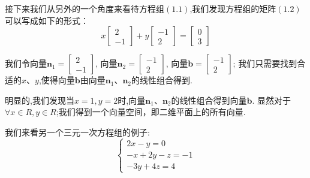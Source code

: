 \documentclass[oneside]{book}
\begin{document}
	接下来我们从另外的一个角度来看待方程组$(1.1)$,我们发现方程组的矩阵$(1.2)$可以写成如下的形式：
	\begin{equation}
		x\left[
		\begin{array}{c}
			2 \\
			-1
		\end{array}
		\right]
		+
		y\left[
		\begin{array}{c}
			-1\\
			2 
		\end{array}
		\right]
		=
		\left[
		\begin{array}{c}
			0\\
			3
		\end{array}
		\right]
	\end{equation}

	我们令向量$
	\textbf{n}_{1}
	=
	\left[
	\begin{array}{c}
		2 \\
		-1
	\end{array}
	\right]
	$,
	向量$
	\textbf{n}_{2}
	=
	\left[
	\begin{array}{c}
		-1 \\
		2
	\end{array}
	\right] 
	$,
	向量$
	\textbf{b}
	=
	\left[
	\begin{array}{c}
		-1 \\
		2
	\end{array}
	\right] 
	$;
	我们只需要找到合适的$x、y$,使得向量$\textbf{b}$由向量$\textbf{n}_{1}$、$\textbf{n}_{2}$的线性组合得到.
	
	明显的,我们发现当$ x=1,y=2 $时,向量$\textbf{n}_{1}$、$\textbf{n}_{2}$的线性组合得到向量$\textbf{b}$.
	显然对于$ \forall x\in R,y\in R$;我们得到一个向量空间，即二维平面上的所有向量.
	
	我们来看另一个三元一次方程组的例子:
	\begin{equation}
		\left\{
		\begin{array}{c}
			2x-y=0\\
			-x+2y-z=-1\\
			-3y+4z=4
		\end{array}
		\right.
	\end{equation}
\end{document}
